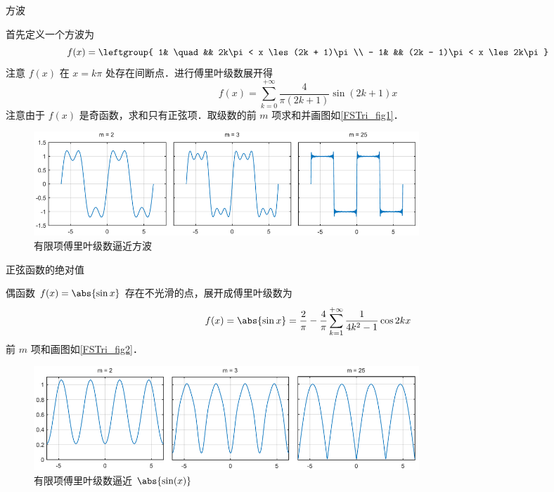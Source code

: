 
\begin{exam}{方波}

首先定义一个方波为
\begin{equation}
f(x) = \leftgroup{
1& \quad && 2k\pi < x \les (2k + 1)\pi \\
- 1& &&   (2k - 1)\pi < x \les 2k\pi 
}\end{equation}
注意 $f(x)$ 在 $x=k\pi$ 处存在间断点．进行傅里叶级数展开得
\begin{equation}
f(x) = \sum_{k = 0}^{+\infty} \frac{4}{\pi (2k + 1)}\sin (2k + 1)x
\end{equation}
注意由于 $f(x)$ 是奇函数，求和只有正弦项．取级数的前 $m$ 项求和并画图如\autoref{FSTri_fig1}．

\begin{figure}[ht]
\centering
\includegraphics[width=14.5cm]{./figures/FSTri1.pdf}
\caption{有限项傅里叶级数逼近方波}\label{FSTri_fig1}
\end{figure}
\end{exam}

\begin{exam}{正弦函数的绝对值} %

偶函数 $f(x) = \abs{\sin x}$ 存在不光滑的点，展开成傅里叶级数为
\begin{equation}
f(x) = \abs{\sin x} = \frac{2}{\pi } - \frac{4}{\pi }\sum_{k = 1}^{+\infty} \frac{1}{4 k^2 - 1}\cos 2k x
\end{equation}
前 $m$ 项和画图如\autoref{FSTri_fig2}．
\begin{figure}[ht]
\centering
\includegraphics[width=14.5cm]{./figures/FSTri2.pdf}
\caption{有限项傅里叶级数逼近 $\abs{\sin(x)}$}\label{FSTri_fig2}
\end{figure}
\end{exam}


